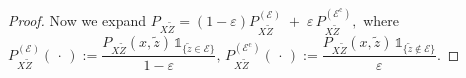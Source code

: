 \documentclass[onecolumn]{IEEEtran} %
\newcommand{\1}{\mathbbm{1}}
\theoremstyle{boldremark}
\begin{document}
\begin{proof}
 
 

Now we expand $
P_{X \tilde{Z}}= (1-\varepsilon)P_{X \tilde{Z}}^{(\mathcal E)}
        \;+\;
        \varepsilon\,P_{X \tilde{Z}}^{(\mathcal E^{\mathrm c})},$
where 
\(
   P_{X \tilde{Z}}^{(\mathcal E)}(\,\cdot\,):=
      \dfrac{P_{X \tilde{Z}}(x, \tilde{z})\,\mathds{1}_{\{ \tilde{z}\in\mathcal E\}}}{1-\varepsilon},
\,
   P_{X \tilde{Z}}^{(\mathcal E^{\mathrm c})}(\,\cdot\,)
      :=\dfrac{P_{X \tilde{Z}}(x, \tilde{z})\,\mathds{1}_{\{ \tilde{z}\notin\mathcal E\}}}{\varepsilon}.
\)


\end{proof}
\end{document}
